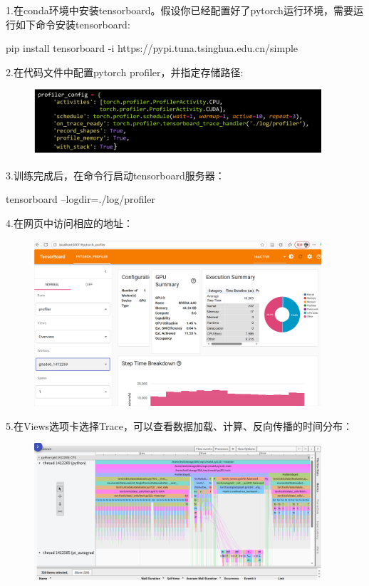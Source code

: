 1.在conda环境中安装tensorboard。假设你已经配置好了pytorch运行环境，需要运行如下命令安装tensorboard:

\begin{center}
pip install tensorboard -i https://pypi.tuna.tsinghua.edu.cn/simple
\end{center}

2.在代码文件中配置pytorch profiler，并指定存储路径:

\begin{figure}[htbp]
        \centering
        \includegraphics[width=0.95\textwidth]{figures/2_2_1.png}
\end{figure}

3.训练完成后，在命令行启动tensorboard服务器：

\begin{center}
tensorboard --logdir=./log/profiler
\end{center}

4.在网页中访问相应的地址：

\begin{figure}[htbp]
        \centering
        \includegraphics[width=0.95\textwidth]{figures/2_2_2.png}
\end{figure}

5.在Views选项卡选择Trace，可以查看数据加载、计算、反向传播的时间分布：

\begin{figure}[htbp]
        \centering
        \includegraphics[width=0.95\textwidth]{figures/2_2_3.png}
\end{figure}



